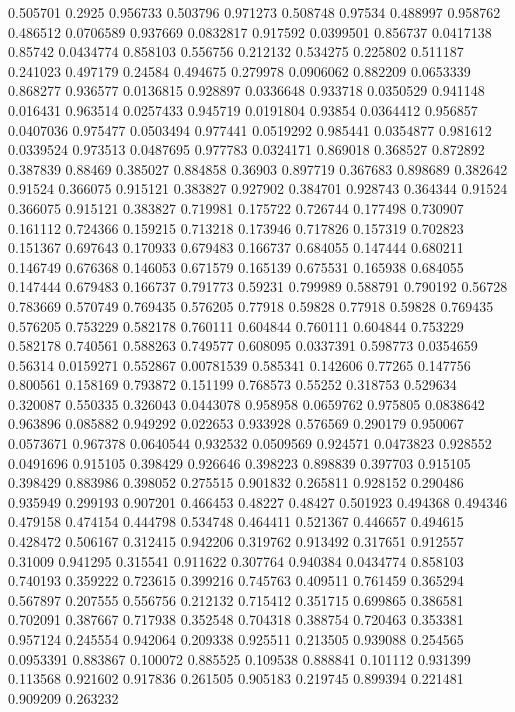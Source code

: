 0.505701 0.2925
0.956733 0.503796
0.971273 0.508748
0.97534 0.488997
0.958762 0.486512
0.0706589 0.937669
0.0832817 0.917592
0.0399501 0.856737
0.0417138 0.85742
0.0434774 0.858103
0.556756 0.212132
0.534275 0.225802
0.511187 0.241023
0.497179 0.24584
0.494675 0.279978
0.0906062 0.882209
0.0653339 0.868277
0.936577 0.0136815
0.928897 0.0336648
0.933718 0.0350529
0.941148 0.016431
0.963514 0.0257433
0.945719 0.0191804
0.93854 0.0364412
0.956857 0.0407036
0.975477 0.0503494
0.977441 0.0519292
0.985441 0.0354877
0.981612 0.0339524
0.973513 0.0487695
0.977783 0.0324171
0.869018 0.368527
0.872892 0.387839
0.88469 0.385027
0.884858 0.36903
0.897719 0.367683
0.898689 0.382642
0.91524 0.366075
0.915121 0.383827
0.927902 0.384701
0.928743 0.364344
0.91524 0.366075
0.915121 0.383827
0.719981 0.175722
0.726744 0.177498
0.730907 0.161112
0.724366 0.159215
0.713218 0.173946
0.717826 0.157319
0.702823 0.151367
0.697643 0.170933
0.679483 0.166737
0.684055 0.147444
0.680211 0.146749
0.676368 0.146053
0.671579 0.165139
0.675531 0.165938
0.684055 0.147444
0.679483 0.166737
0.791773 0.59231
0.799989 0.588791
0.790192 0.56728
0.783669 0.570749
0.769435 0.576205
0.77918 0.59828
0.77918 0.59828
0.769435 0.576205
0.753229 0.582178
0.760111 0.604844
0.760111 0.604844
0.753229 0.582178
0.740561 0.588263
0.749577 0.608095
0.0337391 0.598773
0.0354659 0.56314
0.0159271 0.552867
0.00781539 0.585341
0.142606 0.77265
0.147756 0.800561
0.158169 0.793872
0.151199 0.768573
0.55252 0.318753
0.529634 0.320087
0.550335 0.326043
0.0443078 0.958958
0.0659762 0.975805
0.0838642 0.963896
0.085882 0.949292
0.022653 0.933928
0.576569 0.290179
0.950067 0.0573671
0.967378 0.0640544
0.932532 0.0509569
0.924571 0.0473823
0.928552 0.0491696
0.915105 0.398429
0.926646 0.398223
0.898839 0.397703
0.915105 0.398429
0.883986 0.398052
0.275515 0.901832
0.265811 0.928152
0.290486 0.935949
0.299193 0.907201
0.466453 0.48227
0.48427 0.501923
0.494368 0.494346
0.479158 0.474154
0.444798 0.534748
0.464411 0.521367
0.446657 0.494615
0.428472 0.506167
0.312415 0.942206
0.319762 0.913492
0.317651 0.912557
0.31009 0.941295
0.315541 0.911622
0.307764 0.940384
0.0434774 0.858103
0.740193 0.359222
0.723615 0.399216
0.745763 0.409511
0.761459 0.365294
0.567897 0.207555
0.556756 0.212132
0.715412 0.351715
0.699865 0.386581
0.702091 0.387667
0.717938 0.352548
0.704318 0.388754
0.720463 0.353381
0.957124 0.245554
0.942064 0.209338
0.925511 0.213505
0.939088 0.254565
0.0953391 0.883867
0.100072 0.885525
0.109538 0.888841
0.101112 0.931399
0.113568 0.921602
0.917836 0.261505
0.905183 0.219745
0.899394 0.221481
0.909209 0.263232
